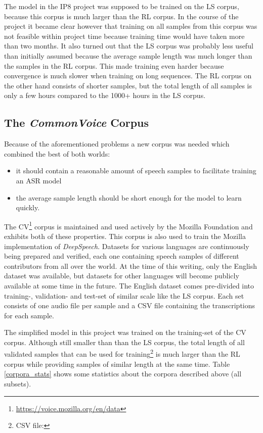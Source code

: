 The model in the IP8 project was supposed to be trained on the \ac{LS} corpus, because this corpus is much larger than the \ac{RL} corpus. In the course of the project it became clear however that training on all samples from this corpus was not feasible within project time because training time would have taken more than two months. It also turned out that the \ac{LS} corpus was probably less useful than initially assumed because the average sample length was much longer than the samples in the \ac{RL} corpus. This made training even harder because convergence is much slower when training on long sequences. The \ac{RL} corpus on the other hand consists of shorter samples, but the total length of all samples is only a few hours compared to the 1000+ hours in the \ac{LS} corpus.

\subsection{The \textit{CommonVoice} Corpus}

Because of the aforementioned problems a new corpus was needed which combined the best of both worlds:

\begin{itemize}
	\item it should contain a reasonable amount of speech samples to facilitate training an ASR model
	\item the average sample length should be short enough for the model to learn quickly.
\end{itemize}

The \ac{CV}\footnote{\url{https://voice.mozilla.org/en/data}} corpus is maintained and used actively by the Mozilla Foundation and exhibits both of these properties. This corpus is also used to train the Mozilla implementation of \textit{DeepSpeech}. Datasets for various languages are continuously being prepared and verified, each one containing speech samples of different contributors from all over the world. At the time of this writing, only the English dataset was available, but datasets for other languages will become publicly available at some time in the future. The English dataset comes pre-divided into training-, validation- and test-set of similar scale like the \ac{LS} corpus. Each set consists of one audio file per sample and a CSV file containing the transcriptions for each sample.

The simplified model in this project was trained on the training-set of the \ac{CV} corpus. Although still smaller than than the \ac{LS} corpus, the total length of all validated samples that can be used for training\footnote{CSV file: } is much larger than the \ac{RL} corpus while providing samples of similar length at the same time. Table \ref{corpora_stats} shows some statistics about the corpora described above (all subsets).

